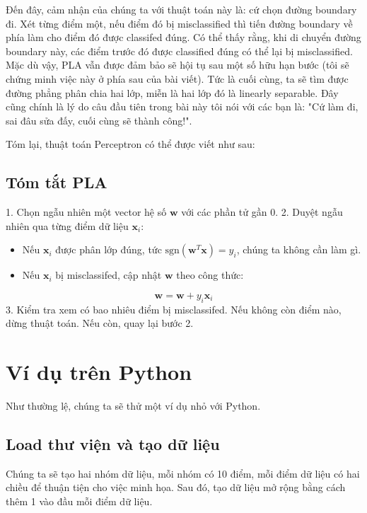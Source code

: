 Đến đây, cảm nhận của chúng ta với thuật toán này là: cứ chọn đường boundary đi. Xét từng điểm một, nếu điểm đó bị misclassified thì tiến đường boundary về phía làm cho điểm đó được classifed đúng. Có thể thấy rằng, khi di chuyển đường boundary này, các điểm trước đó được classified đúng có thể lại bị misclassified. Mặc dù vậy, PLA vẫn được đảm bảo sẽ hội tụ sau một số hữu hạn bước (tôi sẽ chứng minh việc này ở phía sau của bài viết). Tức là cuối cùng, ta sẽ tìm được đường phẳng phân chia hai lớp, miễn là hai lớp đó là linearly separable. Đây cũng chính là lý do câu đầu tiên trong bài này tôi nói với các bạn là: "Cứ làm đi, sai đâu sửa đấy, cuối cùng sẽ thành công!". 
 
Tóm lại, thuật toán Perceptron có thể được viết như sau: 
 
 
\subsection{Tóm tắt PLA }
 
1. Chọn ngẫu nhiên một vector hệ số $\mathbf{w}$ với các phần tử gần 0. 
2. Duyệt ngẫu nhiên qua từng điểm dữ liệu $\mathbf{x}_i$: 
    \begin{itemize}
        \item Nếu $\mathbf{x}_i$ được phân lớp đúng, tức $\text{sgn}(\mathbf{w}^T\mathbf{x}) = y_i$, chúng ta không cần làm gì. 

        \item Nếu $\mathbf{x}_i$ bị misclassifed, cập nhật $\mathbf{w}$ theo công thức: 
    \end{itemize}
    \begin{equation*} 
    \mathbf{w} = \mathbf{w} + y_i\mathbf{x}_i 
    \end{equation*} 
3. Kiểm tra xem có bao nhiêu điểm bị misclassifed. Nếu không còn điểm nào, dừng thuật toán. Nếu còn, quay lại bước 2. 
 
 
 
 
\section{Ví dụ trên Python}
Như thường lệ, chúng ta sẽ thử một ví dụ nhỏ với Python. 
 
 
\subsection{Load thư viện và tạo dữ liệu}
Chúng ta sẽ tạo hai nhóm dữ liệu, mỗi nhóm có 10 điểm, mỗi điểm dữ liệu có hai chiều để thuận tiện cho việc minh họa. Sau đó, tạo dữ liệu mở rộng bằng cách thêm 1 vào đầu mỗi điểm dữ liệu.  
 
